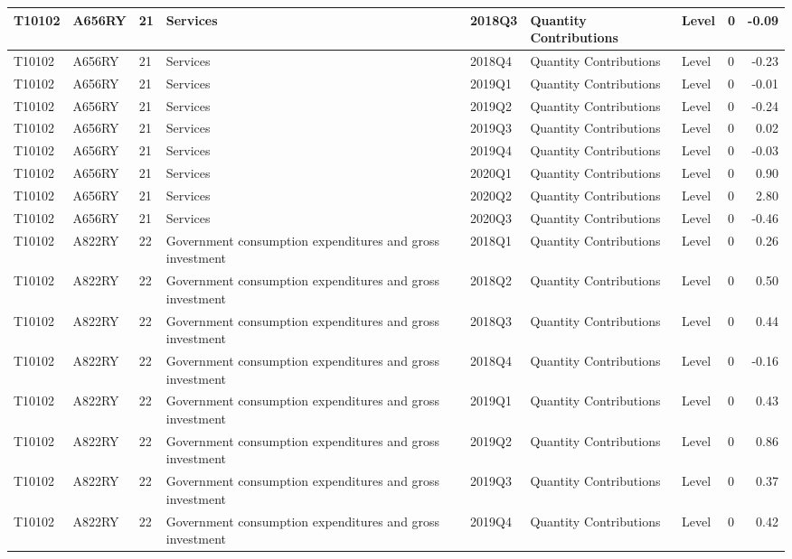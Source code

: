 \documentclass[
]{article}
\begin{document}
\begin{tabular}{l|l|l|l|l|l|l|l|r}
\hline
T10102 & A656RY & 21 & Services & 2018Q3 & Quantity Contributions & Level & 0 & -0.09\\
\hline
T10102 & A656RY & 21 & Services & 2018Q4 & Quantity Contributions & Level & 0 & -0.23\\
\hline
T10102 & A656RY & 21 & Services & 2019Q1 & Quantity Contributions & Level & 0 & -0.01\\
\hline
T10102 & A656RY & 21 & Services & 2019Q2 & Quantity Contributions & Level & 0 & -0.24\\
\hline
T10102 & A656RY & 21 & Services & 2019Q3 & Quantity Contributions & Level & 0 & 0.02\\
\hline
T10102 & A656RY & 21 & Services & 2019Q4 & Quantity Contributions & Level & 0 & -0.03\\
\hline
T10102 & A656RY & 21 & Services & 2020Q1 & Quantity Contributions & Level & 0 & 0.90\\
\hline
T10102 & A656RY & 21 & Services & 2020Q2 & Quantity Contributions & Level & 0 & 2.80\\
\hline
T10102 & A656RY & 21 & Services & 2020Q3 & Quantity Contributions & Level & 0 & -0.46\\
\hline
T10102 & A822RY & 22 & Government consumption expenditures and gross investment & 2018Q1 & Quantity Contributions & Level & 0 & 0.26\\
\hline
T10102 & A822RY & 22 & Government consumption expenditures and gross investment & 2018Q2 & Quantity Contributions & Level & 0 & 0.50\\
\hline
T10102 & A822RY & 22 & Government consumption expenditures and gross investment & 2018Q3 & Quantity Contributions & Level & 0 & 0.44\\
\hline
T10102 & A822RY & 22 & Government consumption expenditures and gross investment & 2018Q4 & Quantity Contributions & Level & 0 & -0.16\\
\hline
T10102 & A822RY & 22 & Government consumption expenditures and gross investment & 2019Q1 & Quantity Contributions & Level & 0 & 0.43\\
\hline
T10102 & A822RY & 22 & Government consumption expenditures and gross investment & 2019Q2 & Quantity Contributions & Level & 0 & 0.86\\
\hline
T10102 & A822RY & 22 & Government consumption expenditures and gross investment & 2019Q3 & Quantity Contributions & Level & 0 & 0.37\\
\hline
T10102 & A822RY & 22 & Government consumption expenditures and gross investment & 2019Q4 & Quantity Contributions & Level & 0 & 0.42\\

\end{tabular}
\end{document}
